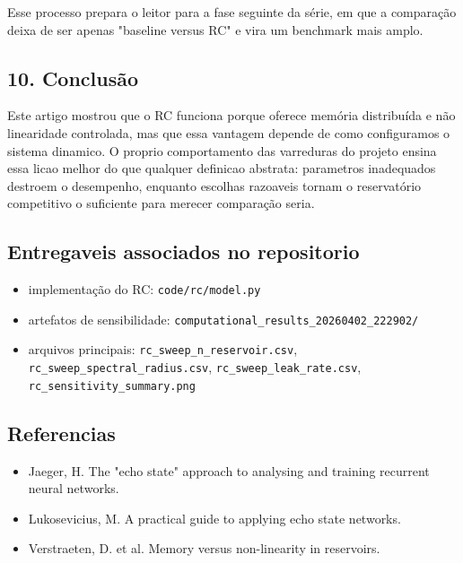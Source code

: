 \documentclass[12pt]{article}
\providecommand{\tightlist}{%
  \setlength{\itemsep}{0pt}\setlength{\parskip}{0pt}}
\begin{document}
Esse processo prepara o leitor para a fase seguinte da série, em que a comparação deixa de ser apenas "baseline versus RC" e vira um benchmark mais amplo.

\subsection{10. Conclusão}\label{10-conclusuxe3o}

Este artigo mostrou que o RC funciona porque oferece memória distribuída e não linearidade controlada, mas que essa vantagem depende de como configuramos o sistema dinamico. O proprio comportamento das varreduras do projeto ensina essa licao melhor do que qualquer definicao abstrata: parametros inadequados destroem o desempenho, enquanto escolhas razoaveis tornam o reservatório competitivo o suficiente para merecer comparação seria.

\subsection{Entregaveis associados no repositorio}\label{entregaveis-associados-no-repositorio}

\begin{itemize}
\tightlist
\item
  implementação do RC: \texttt{code/rc/model.py}
\item
  artefatos de sensibilidade: \texttt{computational\_results\_20260402\_222902/}
\item
  arquivos principais: \texttt{rc\_sweep\_n\_reservoir.csv}, \texttt{rc\_sweep\_spectral\_radius.csv}, \texttt{rc\_sweep\_leak\_rate.csv}, \texttt{rc\_sensitivity\_summary.png}
\end{itemize}

\subsection{Referencias}\label{referencias}

\begin{itemize}
\tightlist
\item
  Jaeger, H. The "echo state" approach to analysing and training recurrent neural networks.
\item
  Lukosevicius, M. A practical guide to applying echo state networks.
\item
  Verstraeten, D. et al. Memory versus non-linearity in reservoirs.
\end{itemize}
\end{document}
